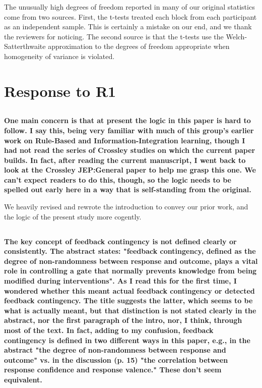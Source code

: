 \documentclass[10pt,a4paper]{article}
\begin{document}
The unusually high degrees of freedom reported in many of our original
statistics come from two sources. First, the t-tests treated each block from
each participant as an independent sample. This is certainly a mistake on our
end, and we thank the reviewers for noticing. The second source is that the
t-tests use the Welch-Satterthwaite approximation to the degrees of freedom
appropriate when homogeneity of variance is violated.

\section{Response to R1}
\subsection{} \textbf{}

\subsection{} \textbf{
  One main concern is that at present the logic in this paper is hard to follow.
  I say this, being very familiar with much of this group's earlier work on
  Rule-Based and Information-Integration learning, though I had not read the
  series of Crossley studies on which the current paper builds. In fact, after
  reading the current manuscript, I went back to look at the Crossley JEP:General
  paper to help me grasp this one. We can't expect readers to do this, though, so
  the logic needs to be spelled out early here in a way that is self-standing from
  the original.
}

We heavily revised and rewrote the introduction to convey our prior work, and
the logic of the present study more cogently.

\subsection{} \textbf{
  The key concept of feedback contingency is not defined clearly or consistently.
  The abstract states: "feedback contingency, defined as the degree of
  non-randomness between response and outcome, plays a vital role in controlling a
  gate that normally prevents knowledge from being modified during interventions".
  As I read this for the first time, I wondered whether this meant actual feedback
  contingency or detected feedback contingency. The title suggests the latter,
  which seems to be what is actually meant, but that distinction is not stated
  clearly in the abstract, nor the first paragraph of the intro, nor, I think,
  through most of the text. In fact, adding to my confusion, feedback contingency
  is defined in two different ways in this paper, e.g., in the abstract "the
  degree of non-randomness between response and outcome" vs. in the discussion (p.
  15) "the correlation between response confidence and response valence." These
  don't seem equivalent.
}
\end{document}
